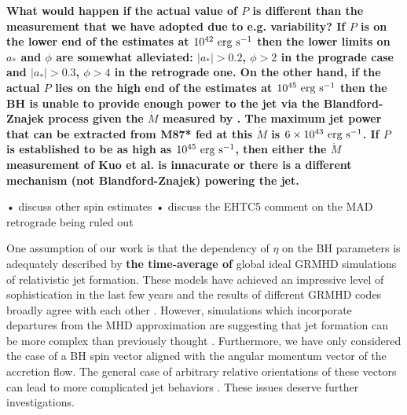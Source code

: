 \documentclass[twocolumn, linenumbers]{aastex62} %
\begin{document}
\textbf{What would happen if the actual value of $P$ is different than the measurement that we have adopted due to e.g. variability? If $P$ is on the lower end of the estimates at $10^{42} \ {\rm erg \ s}^{-1}$  then the lower limits on $a_*$ and $\phi$ are somewhat alleviated: $|a_*| > 0.2$, $\phi > 2$ in the prograde case and $|a_*| > 0.3$, $\phi > 4$ in the retrograde one. On the other hand, if the actual $P$ lies on the high end of the estimates at $10^{45} \ {\rm erg \ s}^{-1}$  then the BH is unable to provide enough power to the jet via the Blandford-Znajek process given the $\dot{M}$ measured by \cite{Kuo2014}. The maximum jet power that can be extracted from M87* fed at this $\dot{M}$ is $6 \times 10^{43} \ {\rm erg \ s}^{-1}$. If $P$ is established to be as high as $10^{45} \ {\rm erg \ s}^{-1}$, then either the $\dot{M}$ measurement of Kuo et al. is innacurate or there is a different mechanism (not Blandford-Znajek) powering the jet.}

• discuss other spin estimates 
• discuss the EHTC5 comment on the MAD retrograde being ruled out

One assumption of our work is that the dependency of $\eta$ on the BH parameters is adequately described by \textbf{the time-average of} global ideal GRMHD simulations of relativistic jet formation. These models have achieved an impressive level of sophistication in the last few years and the results of different GRMHD codes broadly agree with each other . However, simulations which incorporate departures from the MHD approximation are suggesting that jet formation can be more complex than previously thought \citep{Parfrey2019}. Furthermore, we have only considered the case of a BH spin vector aligned with the angular momentum vector of the accretion flow. The general case of arbitrary relative orientations of these vectors can lead to more complicated jet behaviors \citep{Liska2018}. These issues deserve further investigations. 
\end{document}
